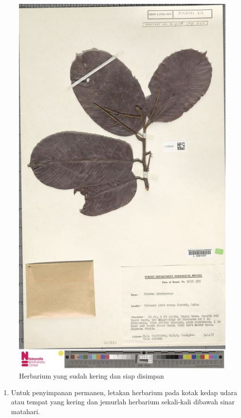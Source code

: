 \documentclass[
  oneside]{book}
\providecommand{\tightlist}{%
  \setlength{\itemsep}{0pt}\setlength{\parskip}{0pt}}
\begin{document}
\begin{figure}

{\centering \includegraphics[width=1\linewidth]{images/herba} 

}

\caption{Herbarium yang sudah kering dan siap disimpan }\label{fig:herba}
\end{figure}

\begin{enumerate}
\def\labelenumi{\arabic{enumi}.}
\setcounter{enumi}{6}
\tightlist
\item
  Untuk penyimpanan permanen, letakan herbarium pada kotak kedap udara atau tempat yang kering dan jemurlah herbarium sekali-kali dibawah sinar matahari.
\end{enumerate}
\end{document}
